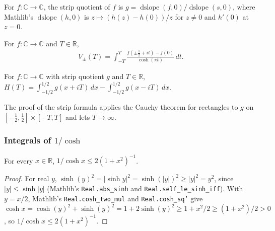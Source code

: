 \begin{definition}
    \label{def:strip-quotient}
    \leanok
    For $f : \mathbb{C} \to \mathbb{C}$, the strip quotient of $f$ is $g = \operatorname{dslope}(f, 0) / \operatorname{dslope}(s, 0)$, where Mathlib's $\operatorname{dslope}(h, 0)$ is $z \mapsto (h(z) - h(0))/z$ for $z \ne 0$ and $h'(0)$ at $z = 0$.
\end{definition}

\begin{definition}
    \label{def:strip-vertical-integrals}
    \leanok
    For $f : \mathbb{C} \to \mathbb{C}$ and $T \in \mathbb{R}$,
    \begin{align}
        V_\pm(T) = \int_{-T}^{T} \frac{f(\pm\tfrac{1}{2} + it) - f(0)}{\cosh(\pi t)} \, dt. \label{eq:strip-sides}
    \end{align}
\end{definition}

\begin{definition}
    \label{def:strip-horizontal-integral}
    \leanok
    For $f : \mathbb{C} \to \mathbb{C}$ with strip quotient $g$ and $T \in \mathbb{R}$,
    $H(T) = \int_{-1/2}^{1/2} g(x + iT) \, dx - \int_{-1/2}^{1/2} g(x - iT) \, dx$.
\end{definition}

The proof of the strip formula applies the Cauchy theorem for rectangles to $g$ on $[-\tfrac{1}{2}, \tfrac{1}{2}] \times [-T, T]$ and lets $T \to \infty$.

\subsubsection{Integrals of $1/\cosh$}

\begin{lemma}
    \label{lmm:inv-cosh-le}
    \leanok
    For every $x \in \mathbb{R}$, $1/\cosh x \le 2(1 + x^2)^{-1}$.
\end{lemma}
\begin{proof}
    \leanok
    For real $y$, $\sinh(y)^2 = |\sinh y|^2 = \sinh(|y|)^2 \ge |y|^2 = y^2$, since $|y| \le \sinh |y|$ (Mathlib's \texttt{Real.abs\_sinh} and \texttt{Real.self\_le\_sinh\_iff}). With $y = x/2$, Mathlib's \texttt{Real.cosh\_two\_mul} and \texttt{Real.cosh\_sq'} give $\cosh x = \cosh(y)^2 + \sinh(y)^2 = 1 + 2\sinh(y)^2 \ge 1 + x^2/2 \ge (1 + x^2)/2 > 0$, so $1/\cosh x \le 2(1 + x^2)^{-1}$.
\end{proof}


